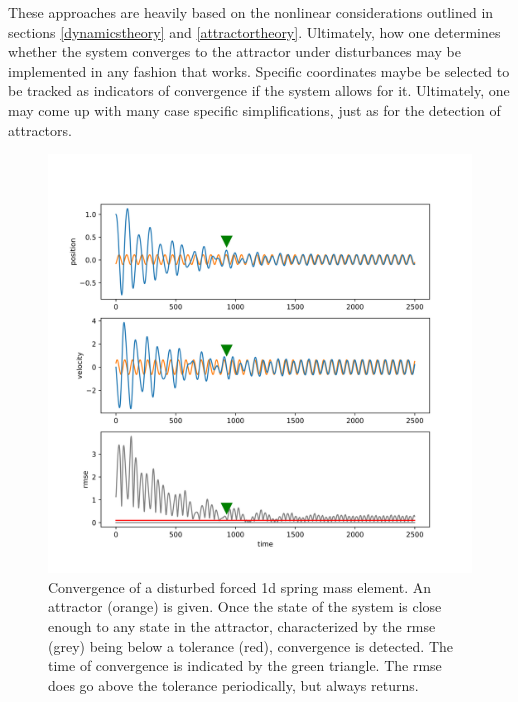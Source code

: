  These approaches are heavily based on the nonlinear considerations outlined in sections \ref{dynamicstheory} and \ref{attractortheory}. Ultimately, how one determines whether the system converges to the attractor under disturbances may be implemented in any fashion that works. Specific coordinates maybe be selected to be tracked as indicators of convergence if the system allows for it. Ultimately, one may come up with many case specific simplifications, just as for the detection of attractors. 

\begin{figure}[h]
\centering
\includegraphics[width=.7\textwidth]{figures/limit_cycle_convergence.png}
\caption[Convergence to Limit Cycle]{Convergence of a disturbed forced 1d spring mass element. An attractor (orange) is given. Once the state of the system is close enough to any state in the attractor, characterized by the rmse (grey) being below a tolerance (red), convergence is detected. The time of convergence is indicated by the green triangle. The rmse does go above the tolerance periodically, but always returns.}
\label{lcconv}
\end{figure}



  



